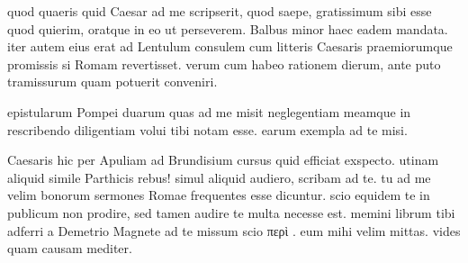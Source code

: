  quod quaeris quid Caesar ad me scripserit, quod saepe, gratissimum sibi esse quod quierim, oratque in eo ut perseverem. Balbus minor haec eadem mandata. iter autem eius erat ad Lentulum consulem cum litteris Caesaris praemiorumque promissis si Romam revertisset. verum cum habeo rationem dierum, ante puto tramissurum quam potuerit conveniri.

 epistularum Pompei duarum quas ad me misit neglegentiam meamque in rescribendo diligentiam volui tibi notam esse. earum exempla ad te misi.

 Caesaris hic per Apuliam ad Brundisium cursus quid efficiat exspecto. utinam aliquid simile Parthicis rebus! simul aliquid audiero, scribam ad te. tu ad me velim bonorum sermones Romae frequentes esse dicuntur. scio equidem te in publicum non prodire, sed tamen audire te multa necesse est. memini librum tibi adferri a Demetrio Magnete ad te missum scio περὶ . eum mihi velim mittas. vides quam causam mediter.
